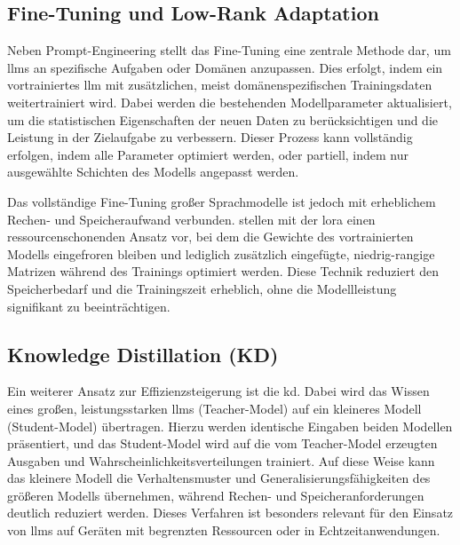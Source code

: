 
\subsection{Fine-Tuning und Low-Rank Adaptation}

Neben Prompt-Engineering stellt das Fine-Tuning eine zentrale Methode dar, um \glspl{llm} an spezifische Aufgaben oder Domänen anzupassen.
Dies erfolgt, indem ein vortrainiertes \gls{llm} mit zusätzlichen, meist domänenspezifischen Trainingsdaten weitertrainiert wird.
Dabei werden die bestehenden Modellparameter aktualisiert, um die statistischen Eigenschaften der neuen Daten zu berücksichtigen und die Leistung in der Zielaufgabe zu verbessern.
Dieser Prozess kann vollständig erfolgen, indem alle Parameter optimiert werden, oder partiell, indem nur ausgewählte Schichten des Modells angepasst werden\autocite{hu_lora_2021}.

Das vollständige Fine-Tuning großer Sprachmodelle ist jedoch mit erheblichem Rechen- und Speicheraufwand verbunden.
\citeauthor{hu_lora_2021} stellen mit der \gls{lora} einen ressourcenschonenden Ansatz vor, bei dem die Gewichte des vortrainierten Modells eingefroren bleiben und lediglich zusätzlich eingefügte, niedrig-rangige Matrizen während des Trainings optimiert werden\autocite{hu_lora_2021}.
Diese Technik reduziert den Speicherbedarf und die Trainingszeit erheblich, ohne die Modellleistung signifikant zu beeinträchtigen.


\subsection{Knowledge Distillation (KD)}

Ein weiterer Ansatz zur Effizienzsteigerung ist die \gls{kd}.
Dabei wird das Wissen eines großen, leistungsstarken \glspl{llm} (Teacher-Model) auf ein kleineres Modell (Student-Model) übertragen.
Hierzu werden identische Eingaben beiden Modellen präsentiert, und das Student-Model wird auf die vom Teacher-Model erzeugten Ausgaben und Wahrscheinlichkeitsverteilungen trainiert.
Auf diese Weise kann das kleinere Modell die Verhaltensmuster und Generalisierungsfähigkeiten des größeren Modells übernehmen, während Rechen- und Speicheranforderungen deutlich reduziert werden.
Dieses Verfahren ist besonders relevant für den Einsatz von \glspl{llm} auf Geräten mit begrenzten Ressourcen oder in Echtzeitanwendungen\autocite{xu_survey_2024}.

